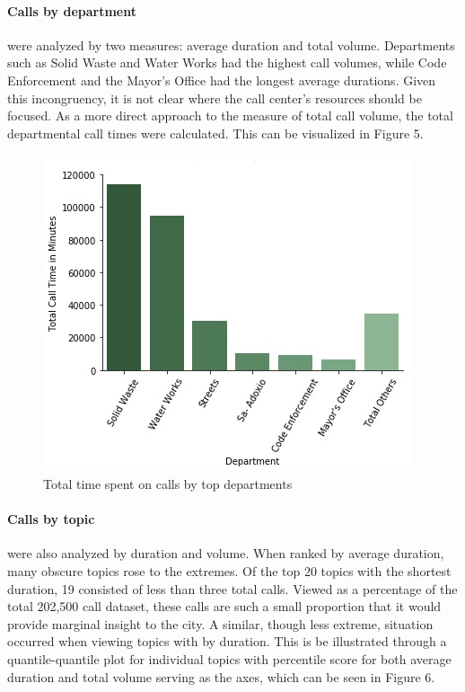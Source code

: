 \documentclass[12pt]{article}
\begin{document}
\paragraph{Calls by department} were analyzed by two measures:  average duration and total volume.  Departments such as Solid Waste and Water Works had the highest call volumes, while Code Enforcement and the Mayor's Office had the longest average durations.  Given this incongruency, it is not clear where the call center's resources should be focused.  As a more direct approach to the measure of total call volume, the total departmental call times were calculated.  This can be visualized in Figure 5.

	\begin{figure}
	\includegraphics[scale=.4]{InkedCalls_Department_sim_LI.jpg}
	\caption{Total time spent on calls by top departments}
	\end{figure}

\paragraph{Calls by topic} were also analyzed by duration and volume.  When ranked by average duration, many obscure topics rose to the extremes.  Of the top 20 topics with the shortest duration, 19 consisted of less than three total calls.  Viewed as a percentage of the total 202,500 call dataset, these calls are such a small proportion that it would provide marginal insight to the city.  A similar, though less extreme, situation occurred when viewing topics with by duration.  This is be illustrated through a quantile-quantile plot for individual topics with percentile score for both average duration and total volume serving as the axes, which can be seen in Figure 6.
\end{document}
